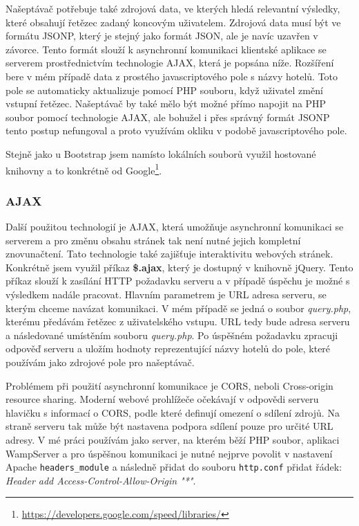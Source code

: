 \documentclass[czech,BP]{thesiskiv}
\begin{document}
Našeptávač potřebuje také zdrojová data, ve kterých hledá relevantní výsledky, které obsahují řetězec zadaný koncovým uživatelem. Zdrojová data musí být ve formátu JSONP, který je stejný jako formát JSON, ale je navíc uzavřen v závorce. Tento formát slouží k asynchronní komunikaci klientské aplikace se serverem prostřednictvím technologie AJAX, která je popsána níže. Rozšíření bere v mém případě data z prostého javascriptového pole s názvy hotelů. Toto pole se automaticky aktualizuje pomocí PHP souboru, když uživatel změní vstupní řetězec. Našeptávač by také mělo být možné přímo napojit na PHP soubor pomocí technologie AJAX, ale bohužel i přes správný formát JSONP tento postup nefungoval a proto využívám okliku v podobě javascriptového pole.


Stejně jako u Bootstrap jsem namísto lokálních souborů využil hostované knihovny a to konkrétně od Google\footnote{\url{https://developers.google.com/speed/libraries/}}.

\subsubsection{AJAX}
Další použitou technologií je AJAX, která umožňuje asynchronní komunikaci se serverem a pro změnu obsahu stránek tak není nutné jejich kompletní znovunačtení. Tato technologie také zajišťuje interaktivitu webových stránek. Konkrétně jsem využil příkaz \textbf{\$.ajax}, který je dostupný v knihovně jQuery. Tento příkaz slouží k zasílání HTTP požadavku serveru a v případě úspěchu je možné s výsledkem nadále pracovat. Hlavním parametrem je URL adresa serveru, se kterým chceme navázat komunikaci. V mém případě se jedná o soubor \textit{query.php}, kterému předávám řetězec z uživatelského vstupu. URL tedy bude adresa serveru a následované umístěním souboru \textit{query.php}. Po úspěšném požadavku zpracuji odpověď serveru a uložím hodnoty reprezentující názvy hotelů do pole, které používám jako zdrojové pole pro našeptávač.


Problémem při použití asynchronní komunikace je CORS, neboli Cross-origin resource sharing. Moderní webové prohlížeče očekávají v odpovědi serveru hlavičku s informací o CORS, podle které definují omezení o sdílení zdrojů. Na straně serveru tak může být nastavena podpora sdílení pouze pro určité URL adresy. V mé práci používám jako server, na kterém běží PHP soubor, aplikaci WampServer a pro úspěšnou komunikaci je nutné nejprve povolit v nastavení Apache \texttt{headers\_module} a následně přidat do souboru \texttt{http.conf} přidat řádek: \textit{Header add Access-Control-Allow-Origin "*"}.
\end{document}

